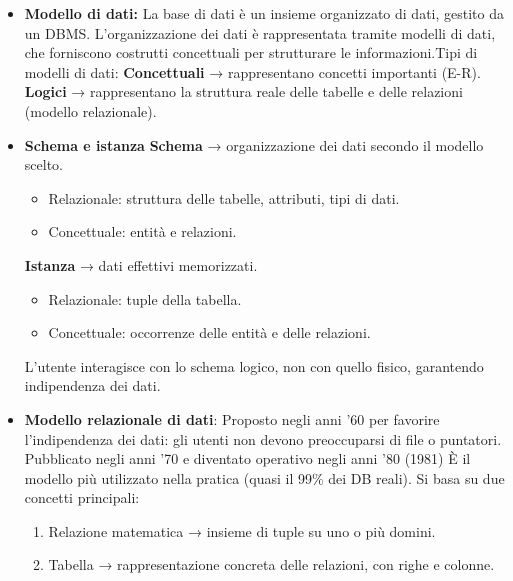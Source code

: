 \documentclass{article}
\begin{document}
\begin{itemize}
\item\textbf{Modello di dati:} La base di dati è un insieme organizzato di dati, gestito da un DBMS. L’organizzazione dei dati è rappresentata tramite modelli di dati, che forniscono costrutti concettuali per strutturare le informazioni.Tipi di modelli di dati: \textbf{Concettuali} → rappresentano concetti importanti (E-R). \textbf{Logici} → rappresentano la struttura reale delle tabelle e delle relazioni (modello relazionale).
\item \textbf{Schema e istanza}
\textbf{Schema} → organizzazione dei dati secondo il modello scelto. \begin{itemize}[label=$\diamond$]
    \item Relazionale: struttura delle tabelle, attributi, tipi di dati.
    \item Concettuale: entità e relazioni.
\end{itemize}
\textbf{Istanza} → dati effettivi memorizzati. \begin{itemize}[label=$\diamond$]
\item Relazionale: tuple della tabella.
\item Concettuale: occorrenze delle entità e delle relazioni.
\end{itemize}
L’utente interagisce con lo schema logico, non con quello fisico, garantendo indipendenza dei dati.
\item \textbf{Modello relazionale di dati}: Proposto negli anni ’60 per favorire l’indipendenza dei dati: gli utenti non devono preoccuparsi di file o puntatori. Pubblicato negli anni ’70 e diventato operativo negli anni ’80 (1981) È il modello più utilizzato nella pratica (quasi il 99$\%$ dei DB reali). Si basa su due concetti principali: \begin{enumerate}
    \item Relazione matematica → insieme di tuple su uno o più domini.
    \item Tabella → rappresentazione concreta delle relazioni, con righe e colonne.
\end{enumerate}
\end{itemize}
\end{document}
